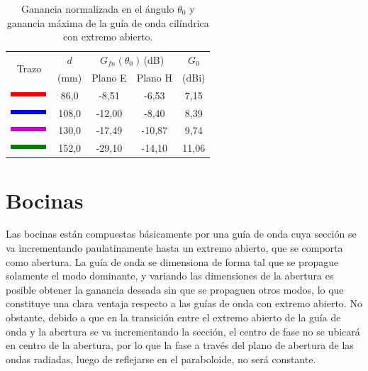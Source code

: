 \begin{table}[H]
\centering
\begin{tabular}{|c|c|c|c|c|}
\hline
\multirow{2}{*}{Trazo} & $d$ & \multicolumn{2}{c|}{$G_{fn}\left(\theta_0\right)\,$(dB)} & $G_0$ \\
\cline{3-4}
& (mm) & Plano E & Plano H & (dBi)\\
\hline
\includegraphics[scale = 1]{Figures/Estudio/linea_tabla_rojo} & 86,0 & -8,51 & -6,53 & 7,15 \\
\hline
\includegraphics[scale = 1]{Figures/Estudio/linea_tabla_azul} & 108,0 & -12,00 & -8,40 & 8,39 \\
\hline
\includegraphics[scale = 1]{Figures/Estudio/linea_tabla_violeta} & 130,0 & -17,49 & -10,87 & 9,74 \\
\hline
\includegraphics[scale = 1]{Figures/Estudio/linea_tabla_verde} & 152,0 & -29,10 & -14,10 & 11,06 \\
\hline
\end{tabular}
\caption{Ganancia normalizada en el ángulo $\theta_0$ y ganancia máxima de la guía de onda cilíndrica con extremo abierto.}
\label{tabla_estudio:6}
\end{table}

\section{Bocinas}
\label{sec_estudio_bocinas}

Las bocinas están compuestas básicamente por una guía de onda cuya sección se va incrementando paulatinamente hasta un extremo abierto, que se comporta como abertura. La guía de onda se dimensiona de forma tal que se propague solamente el modo dominante, y variando las dimensiones de la abertura es posible obtener la ganancia deseada sin que se propaguen otros modos, lo que constituye una clara ventaja respecto a las guías de onda con extremo abierto. No obstante, debido a que en la transición entre el extremo abierto de la guía de onda y la abertura se va incrementando la sección, el centro de fase no se ubicará en centro de la abertura, por lo que la fase a través del plano de abertura de las ondas radiadas, luego de reflejarse en el paraboloide, no será constante.

